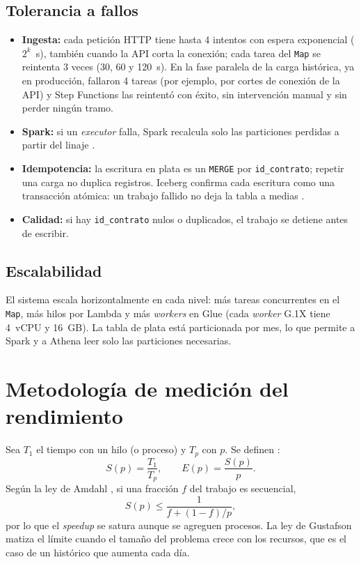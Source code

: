 \documentclass[conference]{IEEEtran}
\begin{document}
\subsection{Tolerancia a fallos}
\begin{itemize}
  \item \textbf{Ingesta:} cada petición HTTP tiene hasta 4 intentos con espera exponencial ($2^k$~s), también cuando la API corta la conexión; cada tarea del \texttt{Map} se reintenta 3 veces (30, 60 y 120~s). En la fase paralela de la carga histórica, ya en producción, fallaron 4 tareas (por ejemplo, por cortes de conexión de la API) y Step Functions las reintentó con éxito, sin intervención manual y sin perder ningún tramo.
  \item \textbf{Spark:} si un \textit{executor} falla, Spark recalcula solo las particiones perdidas a partir del linaje \cite{zaharia2012}.
  \item \textbf{Idempotencia:} la escritura en plata es un \texttt{MERGE} por \texttt{id\_contrato}; repetir una carga no duplica registros. Iceberg confirma cada escritura como una transacción atómica: un trabajo fallido no deja la tabla a medias \cite{iceberg}.
  \item \textbf{Calidad:} si hay \texttt{id\_contrato} nulos o duplicados, el trabajo se detiene antes de escribir.
\end{itemize}

\subsection{Escalabilidad}
El sistema escala horizontalmente en cada nivel: más tareas concurrentes en el \texttt{Map}, más hilos por Lambda y más \textit{workers} en Glue (cada \textit{worker} G.1X tiene 4~vCPU y 16~GB). La tabla de plata está particionada por mes, lo que permite a Spark y a Athena leer solo las particiones necesarias.

\section{Metodología de medición del rendimiento}
Sea $T_1$ el tiempo con un hilo (o proceso) y $T_p$ con $p$. Se definen \cite{grama2003}:
\begin{equation}
S(p) = \frac{T_1}{T_p}, \qquad E(p) = \frac{S(p)}{p}.
\end{equation}
Según la ley de Amdahl \cite{amdahl1967}, si una fracción $f$ del trabajo es secuencial,
\begin{equation}
S(p) \leq \frac{1}{f + (1-f)/p},
\end{equation}
por lo que el \textit{speedup} se satura aunque se agreguen procesos. La ley de Gustafson \cite{gustafson1988} matiza el límite cuando el tamaño del problema crece con los recursos, que es el caso de un histórico que aumenta cada día.
\end{document}
